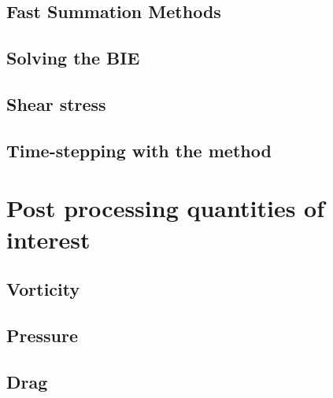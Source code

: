 \documentclass[preprint, 10pt]{elsarticle}
\begin{document}
\subsection{Fast Summation Methods}
\label{sec:FMM}

\subsection{Solving the BIE}
\label{sec:BIE}

 
\subsection{Shear stress}
\label{sec:shearStress}


\subsection{Time-stepping with the {\thL} method} 
\label{sec:timeStepping}


\section{Post processing quantities of interest}
\label{s:qoi}

\subsection{Vorticity}
\subsection{Pressure}
\label{sec:pressure}

\subsection{Drag}
\label{sec:drag}

\end{document}
